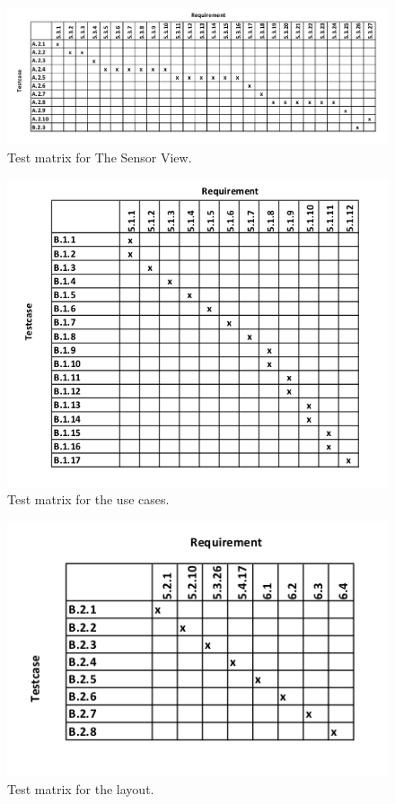 \documentclass[a4paper]{article}
\begin{document}
\begin{appendices}
\begin{figure}[H]
    \centering
    \includegraphics[scale=0.9,angle=-90]{SVVS-pics/testmatrixSensor.png}
    \caption{Test matrix for The Sensor View.}
    \label{fig:testmatrix-sensor}
\end{figure}

\begin{figure}[H]
    \centering
    \includegraphics[scale=0.9]{SVVS-pics/testmatrixUsecases.png}
    \caption{Test matrix for the use cases.}
    \label{fig:testmatrix-usecase}
\end{figure}

\begin{figure}[H]
    \centering
    \includegraphics[scale=0.9]{SVVS-pics/testmatrixLayout.png}
    \caption{Test matrix for the layout.}
    \label{fig:testmatrix-layout}
\end{figure}
\end{appendices}
\end{document}
